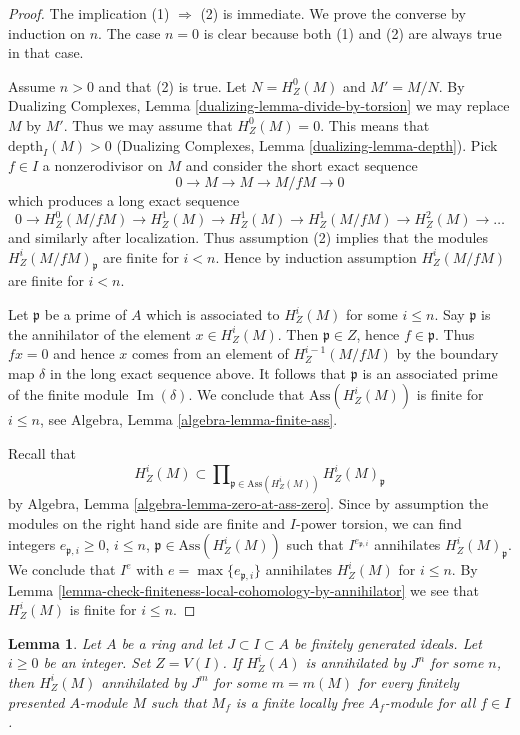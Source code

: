 \documentclass{stacks-project}
\theoremstyle{plain}
\newtheorem{lemma}[subsection]{Lemma}
\theoremstyle{definition}
\theoremstyle{remark}
\numberwithin{equation}{subsection}
\def\Im{\mathop{\mathrm{Im}}}
\begin{document}
\begin{proof}
The implication (1) $\Rightarrow$ (2) is immediate. We prove the converse
by induction on $n$. The case $n = 0$ is clear because both (1) and
(2) are always true in that case.

\medskip\noindent
Assume $n > 0$ and that (2) is true. Let $N = H^0_Z(M)$ and $M' = M/N$.
By Dualizing Complexes, Lemma \ref{dualizing-lemma-divide-by-torsion}
we may replace $M$ by $M'$.
Thus we may assume that $H^0_Z(M) = 0$.
This means that $\text{depth}_I(M) > 0$
(Dualizing Complexes, Lemma \ref{dualizing-lemma-depth}).
Pick $f \in I$ a nonzerodivisor on $M$ and consider the short
exact sequence
$$
0 \to M \to M \to M/fM \to 0
$$
which produces a long exact sequence
$$
0 \to H^0_Z(M/fM) \to H^1_Z(M) \to H^1_Z(M) \to H^1_Z(M/fM) \to
H^2_Z(M) \to \ldots
$$
and similarly after localization. Thus assumption (2) implies that
the modules $H^i_Z(M/fM)_\mathfrak p$ are finite for $i < n$. Hence
by induction assumption $H^i_Z(M/fM)$ are finite for $i < n$.

\medskip\noindent
Let $\mathfrak p$ be a prime of $A$ which is associated to
$H^i_Z(M)$ for some $i \leq n$. Say $\mathfrak p$ is the annihilator
of the element $x \in H^i_Z(M)$. Then $\mathfrak p \in Z$, hence
$f \in \mathfrak p$. Thus $fx = 0$ and hence $x$ comes from an
element of $H^{i - 1}_Z(M/fM)$ by the boundary map $\delta$ in the long
exact sequence above. It follows that $\mathfrak p$ is an associated
prime of the finite module $\Im(\delta)$. We conclude that
$\text{Ass}(H^i_Z(M))$ is finite for $i \leq n$, see
Algebra, Lemma \ref{algebra-lemma-finite-ass}.

\medskip\noindent
Recall that
$$
H^i_Z(M) \subset
\prod\nolimits_{\mathfrak p \in \text{Ass}(H^i_Z(M))}
H^i_Z(M)_\mathfrak p
$$
by Algebra, Lemma \ref{algebra-lemma-zero-at-ass-zero}. Since by
assumption the modules on the right hand side are finite and $I$-power
torsion, we can find integers $e_{\mathfrak p, i} \geq 0$, $i \leq n$,
$\mathfrak p \in \text{Ass}(H^i_Z(M))$ such that
$I^{e_{\mathfrak p, i}}$ annihilates $H^i_Z(M)_\mathfrak p$. We conclude
that $I^e$ with $e = \max\{e_{\mathfrak p, i}\}$ annihilates $H^i_Z(M)$
for $i \leq n$. By
Lemma \ref{lemma-check-finiteness-local-cohomology-by-annihilator}
we see that $H^i_Z(M)$ is finite for $i \leq n$.
\end{proof}

\begin{lemma}
\label{lemma-annihilate-local-cohomology}
Let $A$ be a ring and let $J \subset I \subset A$ be finitely generated ideals.
Let $i \geq 0$ be an integer. Set $Z = V(I)$. If
$H^i_Z(A)$ is annihilated by $J^n$ for some $n$, then
$H^i_Z(M)$ annihilated by $J^m$ for some $m = m(M)$
for every finitely presented $A$-module $M$ such that
$M_f$ is a finite locally free $A_f$-module for all $f \in I$.
\end{lemma}
\end{document}
